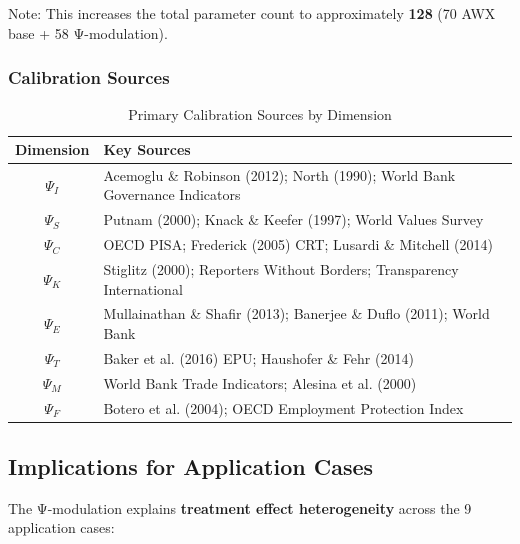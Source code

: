 Note: This increases the total parameter count to approximately \textbf{128} (70 AWX base + 58 Ψ-modulation).

\subsubsection{Calibration Sources}

\begin{table}[htbp]
\centering
\caption{Primary Calibration Sources by Dimension}
\label{tab:psi-sources}
\small
\begin{tabular}{@{}cl@{}}
\toprule
\textbf{Dimension} & \textbf{Key Sources} \\
\midrule
$\Psi_I$ & Acemoglu \& Robinson (2012); North (1990); World Bank Governance Indicators \\
$\Psi_S$ & Putnam (2000); Knack \& Keefer (1997); World Values Survey \\
$\Psi_C$ & OECD PISA; Frederick (2005) CRT; Lusardi \& Mitchell (2014) \\
$\Psi_K$ & Stiglitz (2000); Reporters Without Borders; Transparency International \\
$\Psi_E$ & Mullainathan \& Shafir (2013); Banerjee \& Duflo (2011); World Bank \\
$\Psi_T$ & Baker et al. (2016) EPU; Haushofer \& Fehr (2014) \\
$\Psi_M$ & World Bank Trade Indicators; Alesina et al. (2000) \\
$\Psi_F$ & Botero et al. (2004); OECD Employment Protection Index \\
\bottomrule
\end{tabular}
\end{table}

\subsection{Implications for Application Cases}

The Ψ-modulation explains \textbf{treatment effect heterogeneity} across the 9 application cases:

